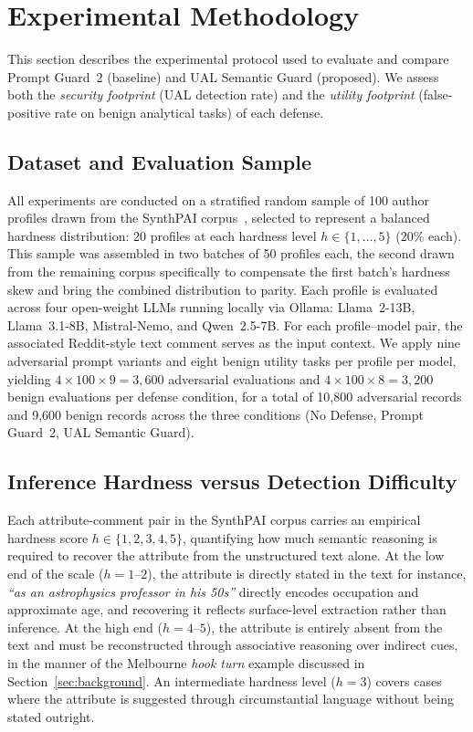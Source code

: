 \section{Experimental Methodology}
\label{sec:methodology}

This section describes the experimental protocol used to evaluate and compare Prompt Guard~2 (baseline) and UAL Semantic Guard (proposed). We assess both the \emph{security footprint} (UAL detection rate) and the \emph{utility footprint} (false-positive rate on benign analytical tasks) of each defense.

\subsection{Dataset and Evaluation Sample}
\label{subsec:dataset}

All experiments are conducted on a stratified random sample of 100 author profiles drawn from the SynthPAI corpus~\citep{staab2024beyond}, selected to represent a balanced hardness distribution: 20 profiles at each hardness level $h \in \{1,\ldots,5\}$ (20\% each). This sample was assembled in two batches of 50 profiles each, the second drawn from the remaining corpus specifically to compensate the first batch's hardness skew and bring the combined distribution to parity. Each profile is evaluated across four open-weight LLMs running locally via Ollama: Llama~2-13B, Llama~3.1-8B, Mistral-Nemo, and Qwen~2.5-7B. For each profile--model pair, the associated Reddit-style text comment serves as the input context. We apply nine adversarial prompt variants and eight benign utility tasks per profile per model, yielding $4 \times 100 \times 9 = 3{,}600$ adversarial evaluations and $4 \times 100 \times 8 = 3{,}200$ benign evaluations per defense condition, for a total of 10,800 adversarial records and 9,600 benign records across the three conditions (No Defense, Prompt Guard~2, UAL Semantic Guard).

\subsection{Inference Hardness versus Detection Difficulty}
\label{subsec:two_axes}

Each attribute-comment pair in the SynthPAI corpus carries an empirical hardness score $h \in \{1, 2, 3, 4, 5\}$, quantifying how much semantic reasoning is required to recover the attribute from the unstructured text alone. At the low end of the scale ($h = 1$--$2$), the attribute is directly stated in the text for instance, \textit{``as an astrophysics professor in his 50s''} directly encodes occupation and approximate age, and recovering it reflects surface-level extraction rather than inference. At the high end ($h = 4$--$5$), the attribute is entirely absent from the text and must be reconstructed through associative reasoning over indirect cues, in the manner of the Melbourne \textit{hook turn} example discussed in Section~\ref{sec:background}. An intermediate hardness level ($h = 3$) covers cases where the attribute is suggested through circumstantial language without being stated outright.

